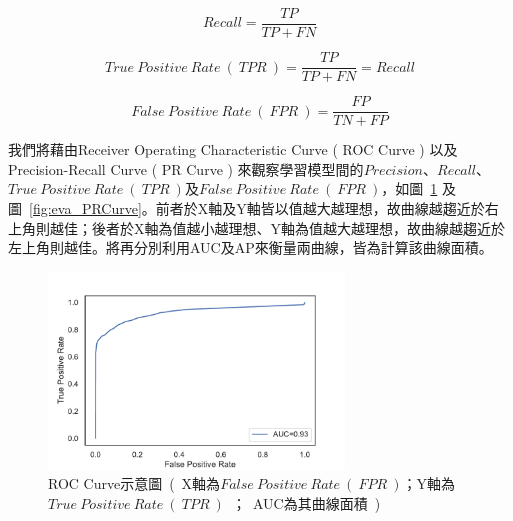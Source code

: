 \begin{equation}
    \label{eq:RecallFormula}
    Recall = \frac{TP}{TP + FN}
\end{equation}

\begin{equation}
    \label{eq:TPRFormula}
    True\ Positive\ Rate\ (\ TPR\ ) = \frac{TP}{TP + FN} = Recall
\end{equation}

\begin{equation}
    \label{eq:FPRFormula}
    False\ Positive\ Rate\ (\ FPR\ ) = \frac{FP}{TN + FP}
\end{equation}
\newpage

我們將藉由Receiver Operating Characteristic Curve ( ROC Curve ) 以及Precision-Recall Curve ( PR Curve ) 來觀察學習模型間的$Precision$、$Recall$、\\$True\ Positive\ Rate\ (\ TPR\ )$及$False\ Positive\ Rate\ (\ FPR\ )$，如圖~\ref{fig:eva_ROCCurve} 及圖~\ref{fig:eva_PRCurve}。前者於X軸及Y軸皆以值越大越理想，故曲線越趨近於右上角則越佳；後者於X軸為值越小越理想、Y軸為值越大越理想，故曲線越趨近於左上角則越佳。將再分別利用AUC及AP來衡量兩曲線，皆為計算該曲線面積。

\begin{figure}[!htb]
    \begin{center}
      \includegraphics[width=0.7\textwidth]{figures/evaluation/Image_ROCCurve.pdf}
      \caption[ROC Curve示意圖]{ROC Curve示意圖\ (\ X軸為$False\ Positive\ Rate\ (\ FPR\ )$；Y軸為$True\ Positive\ Rate\ (\ TPR\ )$\ ；\ AUC為其曲線面積\ )}
      \label{fig:eva_ROCCurve}
    \end{center}
\end{figure}

